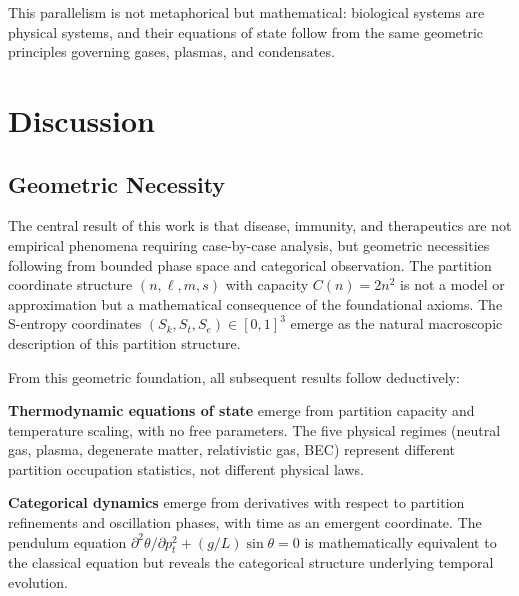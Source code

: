 \documentclass[12pt,a4paper]{article}
\theoremstyle{definition}
\theoremstyle{remark}
\newcommand{\Sk}{S_k}
\newcommand{\St}{S_t}
\newcommand{\Se}{S_e}
\begin{document}
This parallelism is not metaphorical but mathematical: biological systems are physical systems, and their equations of state follow from the same geometric principles governing gases, plasmas, and condensates.













\section{Discussion}
\label{sec:discussion}

\subsection{Geometric Necessity}

The central result of this work is that disease, immunity, and therapeutics are not empirical phenomena requiring case-by-case analysis, but geometric necessities following from bounded phase space and categorical observation. The partition coordinate structure $(n,\ell,m,s)$ with capacity $C(n) = 2n^2$ is not a model or approximation but a mathematical consequence of the foundational axioms. The S-entropy coordinates $(\Sk,\St,\Se) \in [0,1]^3$ emerge as the natural macroscopic description of this partition structure.

From this geometric foundation, all subsequent results follow deductively:

\textbf{Thermodynamic equations of state} emerge from partition capacity and temperature scaling, with no free parameters. The five physical regimes (neutral gas, plasma, degenerate matter, relativistic gas, BEC) represent different partition occupation statistics, not different physical laws.

\textbf{Categorical dynamics} emerge from derivatives with respect to partition refinements and oscillation phases, with time as an emergent coordinate. The pendulum equation $\partial^2\theta/\partial p_t^2 + (g/L)\sin\theta = 0$ is mathematically equivalent to the classical equation but reveals the categorical structure underlying temporal evolution.
\end{document}
